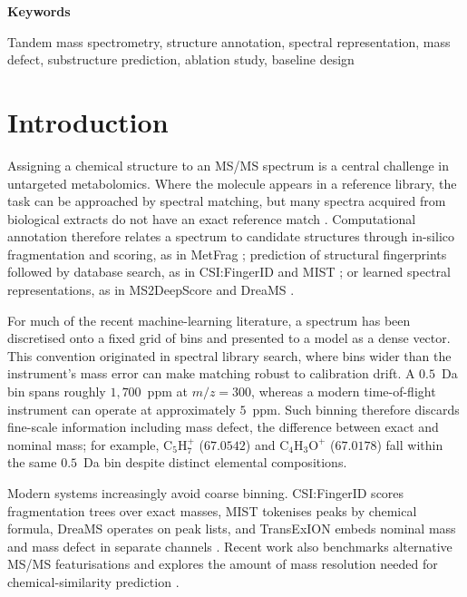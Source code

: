 \documentclass[11pt]{article}
\newcommand{\hd}[1]{\medskip\par\noindent\textbf{#1}\par\nobreak\vspace{2pt}\noindent\ignorespaces}
\newcommand{\mz}{\ensuremath{m/z}}
\begin{document}
\hd{Keywords}
\small Tandem mass spectrometry, structure annotation, spectral representation, mass defect, substructure prediction, ablation study, baseline design
\normalsize

\section*{Introduction}
Assigning a chemical structure to an MS/MS spectrum is a central challenge in untargeted metabolomics. Where the molecule appears in a reference library, the task can be approached by spectral matching, but many spectra acquired from biological extracts do not have an exact reference match \cite{hoffmann2022cosmic}. Computational annotation therefore relates a spectrum to candidate structures through in-silico fragmentation and scoring, as in MetFrag \cite{ruttkies2016metfrag}; prediction of structural fingerprints followed by database search, as in CSI:FingerID \cite{duhrkop2015csifingerid} and MIST \cite{goldman2023mist}; or learned spectral representations, as in MS2DeepScore \cite{huber2021ms2deepscore} and DreaMS \cite{bushuiev2025dreams}.

For much of the recent machine-learning literature, a spectrum has been discretised onto a fixed grid of bins and presented to a model as a dense vector. This convention originated in spectral library search, where bins wider than the instrument's mass error can make matching robust to calibration drift. A $0.5$~Da bin spans roughly $1{,}700$~ppm at $\mz=300$, whereas a modern time-of-flight instrument can operate at approximately $5$~ppm. Such binning therefore discards fine-scale information including mass defect, the difference between exact and nominal mass; for example, $\mathrm{C_5H_7^+}$ ($67.0542$) and $\mathrm{C_4H_3O^+}$ ($67.0178$) fall within the same $0.5$~Da bin despite distinct elemental compositions.

Modern systems increasingly avoid coarse binning. CSI:FingerID scores fragmentation trees over exact masses, MIST tokenises peaks by chemical formula, DreaMS operates on peak lists, and TransExION embeds nominal mass and mass defect in separate channels \cite{buithi2024transexion}. Recent work also benchmarks alternative MS/MS featurisations \cite{gine2026benchmarking} and explores the amount of mass resolution needed for chemical-similarity prediction \cite{dejonge2026cross}.
\end{document}
